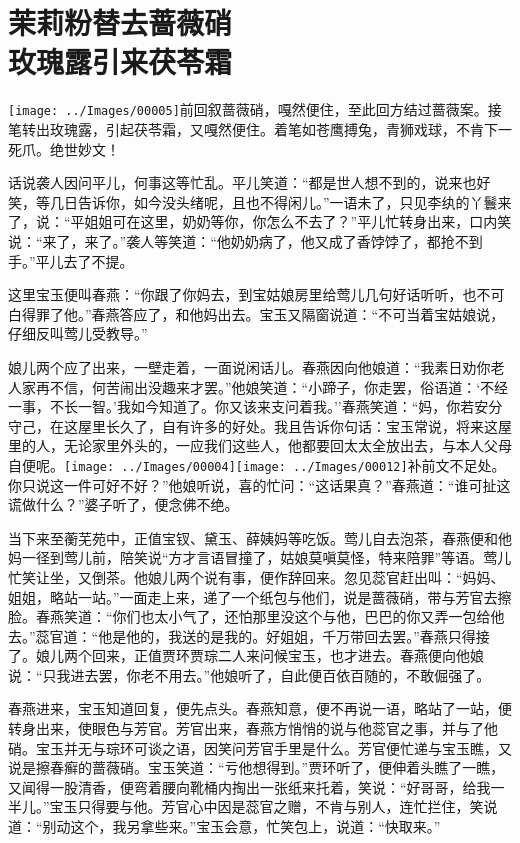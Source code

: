 

\chapter{茉莉粉替去蔷薇硝\\玫瑰露引来茯苓霜}

{\texttt{[image: ../Images/00005]}前回叙蔷薇硝，嘎然便住，至此回方结过蔷薇案。接笔转出玫瑰露，引起茯苓霜，又嘎然便住。着笔如苍鹰搏兔，青狮戏球，不肯下一死爪。绝世妙文！}

话说袭人因问平儿，何事这等忙乱。平儿笑道：``都是世人想不到的，说来也好笑，等几日告诉你，如今没头绪呢，且也不得闲儿。''一语未了，只见李纨的丫鬟来了，说：``平姐姐可在这里，奶奶等你，你怎么不去了？''平儿忙转身出来，口内笑说：``来了，来了。''袭人等笑道：``他奶奶病了，他又成了香饽饽了，都抢不到手。''平儿去了不提。

这里宝玉便叫春燕：``你跟了你妈去，到宝姑娘房里给莺儿几句好话听听，也不可白得罪了他。''春燕答应了，和他妈出去。宝玉又隔窗说道：``不可当着宝姑娘说，仔细反叫莺儿受教导。''

娘儿两个应了出来，一壁走着，一面说闲话儿。春燕因向他娘道：``我素日劝你老人家再不信，何苦闹出没趣来才罢。''他娘笑道：``小蹄子，你走罢，俗语道：`不经一事，不长一智。'我如今知道了。你又该来支问着我。''春燕笑道：``妈，你若安分守己，在这屋里长久了，自有许多的好处。我且告诉你句话：宝玉常说，将来这屋里的人，无论家里外头的，一应我们这些人，他都要回太太全放出去，与本人父母自便呢。{\texttt{[image: ../Images/00004]}\texttt{[image: ../Images/00012]}\footnotesize \kaishu 补前文不足处。}你只说这一件可好不好？''他娘听说，喜的忙问：``这话果真？''春燕道：``谁可扯这谎做什么？''婆子听了，便念佛不绝。

当下来至蘅芜苑中，正值宝钗、黛玉、薛姨妈等吃饭。莺儿自去泡茶，春燕便和他妈一径到莺儿前，陪笑说``方才言语冒撞了，姑娘莫嗔莫怪，特来陪罪''等语。莺儿忙笑让坐，又倒茶。他娘儿两个说有事，便作辞回来。忽见蕊官赶出叫：``妈妈、姐姐，略站一站。''一面走上来，递了一个纸包与他们，说是蔷薇硝，带与芳官去擦脸。春燕笑道：``你们也太小气了，还怕那里没这个与他，巴巴的你又弄一包给他去。''蕊官道：``他是他的，我送的是我的。好姐姐，千万带回去罢。''春燕只得接了。娘儿两个回来，正值贾环贾琮二人来问候宝玉，也才进去。春燕便向他娘说：``只我进去罢，你老不用去。''他娘听了，自此便百依百随的，不敢倔强了。

春燕进来，宝玉知道回复，便先点头。春燕知意，便不再说一语，略站了一站，便转身出来，使眼色与芳官。芳官出来，春燕方悄悄的说与他蕊官之事，并与了他硝。宝玉并无与琮环可谈之语，因笑问芳官手里是什么。芳官便忙递与宝玉瞧，又说是擦春癣的蔷薇硝。宝玉笑道：``亏他想得到。''贾环听了，便伸着头瞧了一瞧，又闻得一股清香，便弯着腰向靴桶内掏出一张纸来托着，笑说：``好哥哥，给我一半儿。''宝玉只得要与他。芳官心中因是蕊官之赠，不肯与别人，连忙拦住，笑说道：``别动这个，我另拿些来。''宝玉会意，忙笑包上，说道：``快取来。''

